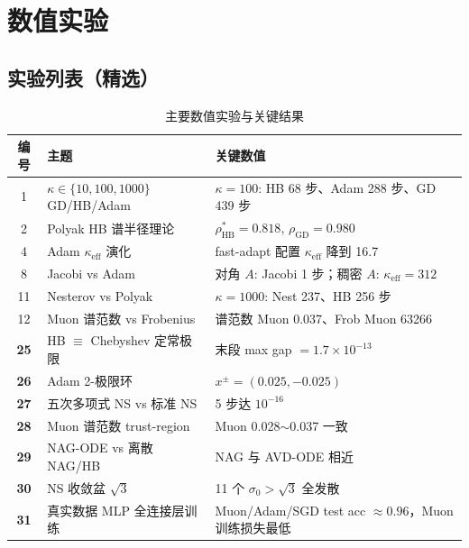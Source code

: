 \section{数值实验}
\label{sec:experiments}

%

\subsection{实验列表（精选）}

\begin{table}[H]
  \centering
  \caption{主要数值实验与关键结果}
  \label{tab:experiments}
  \small
  \begin{tabular}{@{}cll@{}}
    \toprule
    编号 & 主题 & 关键数值 \\
    \midrule
    1 & $\kappa\in\{10,100,1000\}$ GD/HB/Adam & $\kappa{=}100$: HB 68 步、Adam 288 步、GD 439 步 \\
    2 & Polyak HB 谱半径理论 & $\rho^*_{\mathrm{HB}}{=}0.818$, $\rho_{\mathrm{GD}}{=}0.980$ \\
    4 & Adam $\kappa_{\mathrm{eff}}$ 演化 & fast-adapt 配置 $\kappa_{\mathrm{eff}}$ 降到 16.7 \\
    8 & Jacobi vs Adam & 对角 $A$: Jacobi 1 步；稠密 $A$: $\kappa_{\mathrm{eff}}{=}312$ \\
    11 & Nesterov vs Polyak & $\kappa{=}1000$: Nest 237、HB 256 步 \\
    12 & Muon 谱范数 vs Frobenius & 谱范数 Muon 0.037、Frob Muon 63266 \\
    \textbf{25} & HB $\equiv$ Chebyshev 定常极限 & 末段 max gap $= 1.7\times 10^{-13}$ \\
    \textbf{26} & Adam 2-极限环 & $x^\pm{=}(0.025,-0.025)$ \\
    \textbf{27} & 五次多项式 NS vs 标准 NS & 5 步达 $10^{-16}$ \\
    \textbf{28} & Muon 谱范数 trust-region & Muon 0.028$\sim$0.037 一致 \\
    \textbf{29} & NAG-ODE vs 离散 NAG/HB & NAG 与 AVD-ODE 相近 \\
    \textbf{30} & NS 收敛盆 $\sqrt 3$ & 11 个 $\sigma_0{>}\sqrt 3$ 全发散 \\
    \textbf{31} & 真实数据 MLP 全连接层训练 & Muon/Adam/SGD test acc $\approx 0.96$，Muon 训练损失最低 \\
    \bottomrule
  \end{tabular}
\end{table}

